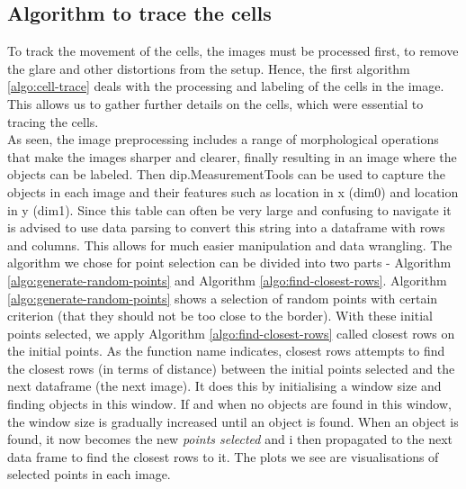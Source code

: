 \documentclass{article}
\begin{document}
\subsection*{Algorithm to trace the cells}
To track the movement of the cells, the images must be processed first, to remove the glare and other distortions from the setup. Hence, the first algorithm \ref{algo:cell-trace} deals with the processing and labeling of the cells in the image. This allows us to gather further details on the cells, which were essential to tracing the cells. 
~\\ As seen, the image preprocessing includes a range of morphological operations that make the images sharper and clearer, finally resulting in an image where the objects can be labeled. Then dip.MeasurementTools can be used to capture the objects in each image and their features such as location in x (dim0) and location in y (dim1). Since this table can often be very large and confusing to navigate it is advised to use data parsing to convert this string into a dataframe with rows and columns. This allows for much easier manipulation and data wrangling.  \newline
The algorithm we chose for point selection can be divided into two parts - Algorithm \ref{algo:generate-random-points} and Algorithm \ref{algo:find-closest-rows}. Algorithm \ref{algo:generate-random-points} shows a selection of random points with certain criterion (that they should not be too close to the border). With these initial points selected, we apply Algorithm \ref{algo:find-closest-rows} called closest rows on the initial points. As the function name indicates, closest rows attempts to find the closest rows (in terms of distance) between the initial points selected and the next dataframe (the next image). It does this by initialising a window size and finding objects in this window. If and when no objects are found in this window, the window size is gradually increased until an object is found. When an object is found, it now becomes the new \emph{points selected} and i then propagated to the next data frame to find the closest rows to it. 
The plots we see are visualisations of selected points in each image. 
\end{document}
